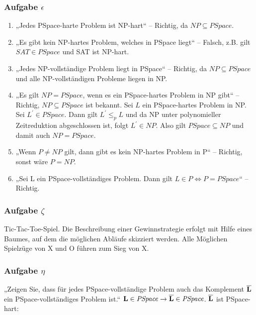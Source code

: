 \subsubsection*{Aufgabe $\epsilon$}
    \begin{enumerate}
        \item „Jedes PSpace-harte Problem ist NP-hart“ – Richtig, da $\mathit{NP} \subseteq \mathit{PSpace}$.
        \item „Es gibt kein NP-hartes Problem, welches in PSpace liegt“ – Falsch, z.B. gilt $\mathit{SAT} \in \mathit{PSpace}$ und SAT ist NP-hart.
        \item „Jedes NP-vollständige Problem liegt in PSpace“ – Richtig, da $\mathit{NP} \subseteq \mathit{PSpace}$ und alle NP-vollständigen Probleme liegen in NP.

        \item „Es gilt $\mathit{NP} = \mathit{PSpace}$, wenn es ein PSpace-hartes Problem in NP gibt“ – Richtig, $\mathit{NP} \subseteq \mathit{PSpace}$ ist bekannt. Sei $L$ ein PSpace-hartes Problem in NP. Sei $L^{'} \in \mathit{PSpace}$. Dann gilt $L^{'} \leq_{p} L$ und da NP unter polynomieller Zeitreduktion abgeschlossen ist, folgt $L^{'} \in \mathit{NP}$. Also gilt $\mathit{PSpace} \subseteq \mathit{NP}$ und damit auch $\mathit{NP} = \mathit{PSpace}$.

        \item „Wenn $P \neq NP$ gilt, dann gibt es kein NP-hartes Problem in P“ – Richtig, sonst wäre $P = NP$.

        \item „Sei L ein PSpace-vollständiges Problem. Dann gilt $L \in P \Longleftrightarrow P = PSpace$“ – Richtig. %
    \end{enumerate}

\subsubsection*{Aufgabe $\zeta$}
    Tic-Tac-Toe-Spiel. Die Beschreibung einer Gewinnstrategie erfolgt mit Hilfe eines Baumes, auf dem die möglichen Abläufe skizziert werden. Alle Möglichen Spielzüge von X und O führen zum Sieg von X.

\subsubsection*{Aufgabe $\eta$}
    „Zeigen Sie, dass für jedes PSpace-vollständige Problem  auch das Komplement $\overline{\textbf{L}}$ ein PSpace-vollständiges Problem ist.“
    $\textbf{L} \in \mathit{PSpace} \to \overline{\textbf{L}} \in \mathit{PSpace}$. $\overline{\textbf{L}}$ ist PSpace-hart:

